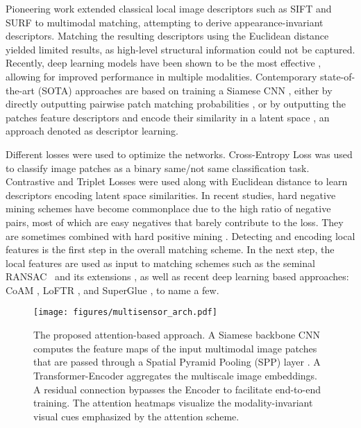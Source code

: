 \documentclass[10pt,journal]{IEEEtran}\usepackage{amsfonts}
\begin{document}
Pioneering work \cite{SIFT_RT, symmetric_SIFT, multispectral_image_fp}
extended classical local image descriptors such as SIFT \cite{SIFT} and SURF
\cite{surf} to multimodal matching, attempting to derive
appearance-invariant descriptors. Matching the resulting descriptors using
the Euclidean distance yielded limited results, as high-level structural
information could not be captured. Recently, deep learning models have been
shown to be the most effective \cite{PN_net, Q-net, TS-net, multisensor,
BetterAndFaster}, allowing for improved performance in multiple modalities.
Contemporary state-of-the-art (SOTA) approaches are based on training a
Siamese CNN \cite{siamesenn}, either by directly outputting pairwise patch
matching probabilities \cite{Zagoruyko,MatchNet,TS-net}, or by outputting
the patches feature descriptors and encode their similarity in a latent
space \cite{SimoSerra,HardNet,L2Net}, an approach denoted as descriptor
learning.

Different losses were used to optimize the networks. Cross-Entropy Loss was
used \cite{MatchNet, Q-net, TS-net} to classify image patches as a binary
same/not same classification task. Contrastive \cite{SimoSerra, multisensor}
and Triplet Losses \cite{HardNet} were used along with Euclidean distance to
learn descriptors encoding latent space similarities. In recent studies,
hard negative mining schemes \cite{PN_net, HardNet, multisensor, Twin_net}
have become commonplace due to the high ratio of negative pairs, most of
which are easy negatives that barely contribute to the loss. They are
sometimes combined with hard positive mining \cite{SimoSerra, Q-net,
BetterAndFaster}. Detecting and encoding local features is the first step in
the overall matching scheme. In the next step, the local features are used
as input to matching schemes such as the seminal RANSAC\ \cite{RANSAC} and
its extensions \cite{MAGSAC++}, as well as recent deep learning based
approaches: CoAM \cite{CoAM}, LoFTR \cite{LoFTR}, and SuperGlue \textbf{\cite {SuperGlue}}, to name a few.
\begin{figure*}[tb]
\centering\texttt{[image: figures/multisensor\_arch.pdf]}
\caption{The proposed attention-based approach. A Siamese backbone CNN
computes the feature maps of the input multimodal image patches that are
passed through a Spatial Pyramid Pooling (SPP) layer \protect\cite{SPP}. A
Transformer-Encoder aggregates the multiscale image embeddings. A residual
connection bypasses the Encoder to facilitate end-to-end training. The
attention heatmaps visualize the modality-invariant visual cues emphasized
by the attention scheme.}
\label{fig:arch}
\end{figure*}
\end{document}
